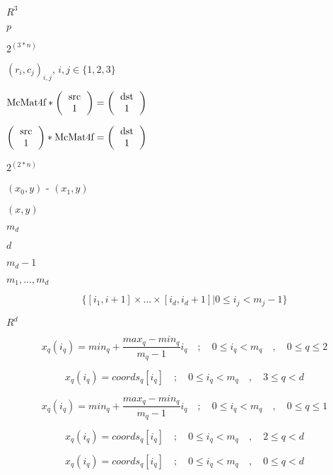 \documentclass{article}
\begin{document}
$R^3$
\pagebreak

$p$
\pagebreak

$2^{(3*n)}$
\pagebreak

$(r_i, c_j)_{i,j}$, $i,j \in \{1,2,3\}$
\pagebreak

$ \mbox{McMat4f} * \left( \begin{tabular}{c} src\\ 1 \\ \end{tabular} \right) =\left( \begin{tabular}{c} dst\\ 1 \\ \end{tabular} \right)$
\pagebreak

$ \left( \begin{tabular}{c} src\\ 1 \\ \end{tabular} \right) * \mbox{McMat4f} =\left( \begin{tabular}{c} dst\\ 1 \\ \end{tabular} \right)$
\pagebreak

$2^(2*n)$
\pagebreak

$( x_0, y)$ - $( x_1, y)$
\pagebreak

$( x, y)$
\pagebreak

$ m_d $
\pagebreak

$ d $
\pagebreak

$ m_d - 1 $
\pagebreak

$ m_1, \ldots, m_d $
\pagebreak

\[ \{ [i_1, i+1] \times \ldots \times [i_d, i_d+1] | 0 \leq i_j < m_j - 1\} \]
\pagebreak

$ R^d $
\pagebreak

\[ x_{q}(i_q) = min_{q} + \frac{max_{q} - min_{q}}{m_{q} - 1} i_q \quad ; \quad 0 \leq i_q < m_q \quad , \quad 0 \leq q \leq 2 \]
\pagebreak

\[ x_{q} (i_q) = coords_{q} [i_q] \quad ; \quad 0 \leq i_q < m_q \quad , \quad 3 \leq q < d \]
\pagebreak

\[ x_{q}(i_q) = min_{q} + \frac{max_{q} - min_{q}}{m_{q} - 1} i_q \quad ; \quad 0 \leq i_q < m_q \quad , \quad 0 \leq q \leq 1 \]
\pagebreak

\[ x_{q} (i_q) = coords_{q} [i_q] \quad ; \quad 0 \leq i_q < m_q \quad , \quad 2 \leq q < d \]
\pagebreak

\[ x_{q} (i_q) = coords_{q} [i_q] \quad ; \quad 0 \leq i_q < m_q \quad , \quad 0 \leq q < d \]
\pagebreak
\end{document}
